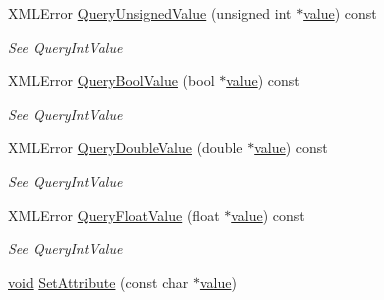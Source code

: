 \begin{DoxyCompactItemize}
\item 
\mbox{\label{classtinyxml2_1_1_x_m_l_attribute_a48a7f3496f1415832e451bd8d09c9cb9}} 
X\+M\+L\+Error \hyperlink{classtinyxml2_1_1_x_m_l_attribute_a48a7f3496f1415832e451bd8d09c9cb9}{Query\+Unsigned\+Value} (unsigned int $\ast$\hyperlink{unionvalue}{value}) const
\begin{DoxyCompactList}\small\item\em See Query\+Int\+Value \end{DoxyCompactList}\item 
\mbox{\label{classtinyxml2_1_1_x_m_l_attribute_a5f32e038954256f61c21ff20fd13a09c}} 
X\+M\+L\+Error \hyperlink{classtinyxml2_1_1_x_m_l_attribute_a5f32e038954256f61c21ff20fd13a09c}{Query\+Bool\+Value} (bool $\ast$\hyperlink{unionvalue}{value}) const
\begin{DoxyCompactList}\small\item\em See Query\+Int\+Value \end{DoxyCompactList}\item 
\mbox{\label{classtinyxml2_1_1_x_m_l_attribute_a2aa6e55e8ea03af0609cf6690bff79b9}} 
X\+M\+L\+Error \hyperlink{classtinyxml2_1_1_x_m_l_attribute_a2aa6e55e8ea03af0609cf6690bff79b9}{Query\+Double\+Value} (double $\ast$\hyperlink{unionvalue}{value}) const
\begin{DoxyCompactList}\small\item\em See Query\+Int\+Value \end{DoxyCompactList}\item 
\mbox{\label{classtinyxml2_1_1_x_m_l_attribute_a049dea6449a6259b6cfed44a9427b607}} 
X\+M\+L\+Error \hyperlink{classtinyxml2_1_1_x_m_l_attribute_a049dea6449a6259b6cfed44a9427b607}{Query\+Float\+Value} (float $\ast$\hyperlink{unionvalue}{value}) const
\begin{DoxyCompactList}\small\item\em See Query\+Int\+Value \end{DoxyCompactList}\item 
\mbox{\label{classtinyxml2_1_1_x_m_l_attribute_a406d2c4a13c7af99a65edb59dd9f7581}} 
\hyperlink{interfacevoid}{void} \hyperlink{classtinyxml2_1_1_x_m_l_attribute_a406d2c4a13c7af99a65edb59dd9f7581}{Set\+Attribute} (const char $\ast$\hyperlink{unionvalue}{value})

\end{DoxyCompactItemize}
